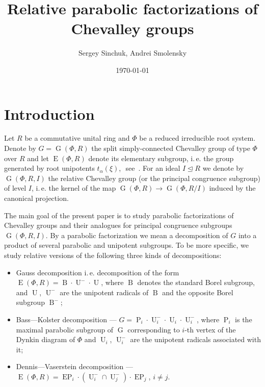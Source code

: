 \documentclass[12pt]{amsart}
\title{Relative parabolic factorizations of Chevalley groups}
\author {Sergey Sinchuk, Andrei Smolensky}
\date {\today}
\numberwithin{equation}{section}
\theoremstyle{definition}
\DeclareMathOperator{\G}{G}
\DeclareMathOperator{\E}{E}
\DeclareMathOperator{\EP}{EP}
\DeclareMathOperator{\Par}{P}
\DeclareMathOperator{\B}{B}
\DeclareMathOperator{\U}{U}
\begin{document}

\maketitle

\section{Introduction}\label{sec:intro}
Let $R$ be a commutative unital ring and $\Phi$ be a reduced irreducible root system.
Denote by $G=\G(\Phi, R)$ the split simply-connected Chevalley group of type $\Phi$ over $R$ and let $\E(\Phi, R)$ denote its elementary subgroup, 
 i.\,e. the group generated by root unipotents $t_\alpha(\xi)$, $ $ see~\cite{VP, St78, S}.
For an ideal $I \trianglelefteq R$ we denote by $\G(\Phi, R, I)$ the relative Chevalley group (or the principal congruence subgroup) of level $I$, 
i.\,e. the kernel of the map $\G(\Phi, R)\rightarrow\G(\Phi, R/I)$ induced by the canonical projection.

The main goal of the present paper is to study parabolic factorizations of Chevalley groups and their analogues for principal congruence subgroups $\G(\Phi, R, I)$.
By a parabolic factorization we mean a decomposition of $G$ into a product of several parabolic and unipotent subgroups.
To be more specific, we study relative versions of the following three kinds of decompositions:
\begin{itemize}
\item Gauss decomposition i.\,e. decomposition of the form $\E(\Phi,R)=\B \cdot \U^- \cdot \U$, where $\B$ denotes the standard Borel subgroup,
      and $\U$, $\U^-$ are the unipotent radicals of $\B$ and the opposite Borel subgroup $\B^-$;
\item Bass---Kolster decomposition --- $G = \Par_i \cdot \U_i^- \cdot \U_i \cdot \U_i^-$, where 
      $\Par_i$ is the maximal parabolic subgroup of $\G$ corresponding to $i$-th vertex of the Dynkin diagram of $\Phi$ and 
      $\U_i$, $\U_i^-$ are the unipotent radicals associated with it;
\item Dennis---Vaserstein decomposition --- $\E(\Phi, R) = \EP_i \cdot (\U_i^- \cap \U_j^-) \cdot \EP_j$, $i\neq j$.
\end{itemize}
\end{document}
